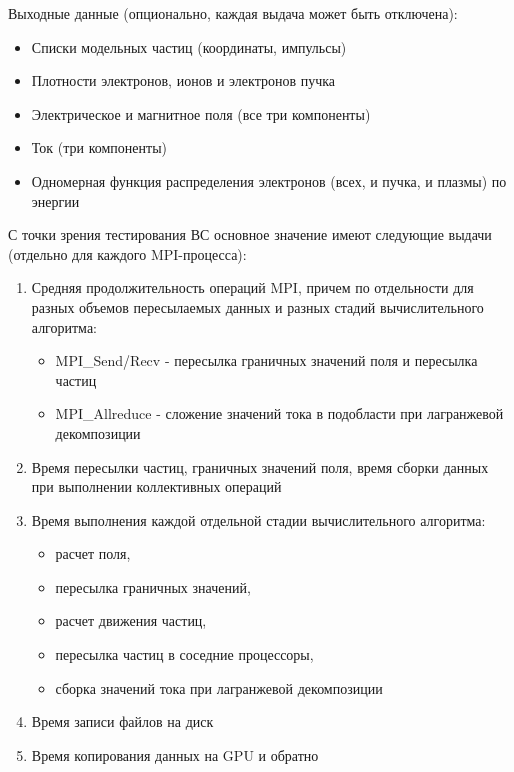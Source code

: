 Выходные данные (опционально, каждая выдача может быть отключена):
\begin{itemize}
\item Списки модельных частиц (координаты, импульсы)
\item Плотности электронов, ионов и электронов пучка
\item Электрическое и магнитное поля (все три компоненты)
\item Ток (три компоненты)
\item Одномерная функция распределения электронов (всех, и пучка, и плазмы) по энергии
\end{itemize}

С точки зрения тестирования ВС основное значение имеют следующие выдачи (отдельно для каждого MPI-процесса):

\begin{enumerate}
	\item Средняя продолжительность операций MPI, причем по отдельности для разных объемов пересылаемых данных и разных стадий вычислительного алгоритма:
	\begin{itemize}
		\item MPI\_Send/Recv - пересылка граничных значений поля и пересылка частиц
		\item MPI\_Allreduce - сложение значений тока в подобласти при лагранжевой декомпозиции
		
	\end{itemize}	
	\item Время пересылки частиц, граничных значений поля, время сборки данных при выполнении коллективных операций   
	\item Время выполнения каждой отдельной стадии вычислительного алгоритма:
	\begin{itemize}
		\item расчет поля, 
		\item пересылка граничных значений, 
		\item расчет движения частиц, 
		\item пересылка частиц в соседние процессоры, 
		\item сборка значений тока при лагранжевой декомпозиции
	\end{itemize}
	\item Время записи файлов на диск 
	\item Время копирования данных на GPU и обратно
	
\end{enumerate}



